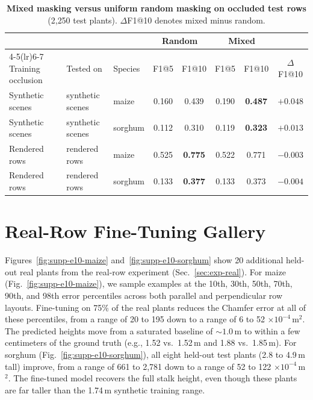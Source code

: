 \documentclass[10pt,twocolumn,letterpaper]{article}
\begin{document}
\begin{table}[t]
  \caption{\textbf{Mixed masking versus uniform random masking on occluded test rows} (2{,}250 test plants). $\Delta$F1@10 denotes mixed minus random.}
  \label{tab:mixed_scene}
  \centering\small
  \begin{tabular}{@{}lllccccc@{}}
    \toprule
    & & & \multicolumn{2}{c}{Random} & \multicolumn{2}{c}{Mixed} & \\
    \cmidrule(lr){4-5}\cmidrule(lr){6-7}
    Training occlusion & Tested on & Species & F1@5 & F1@10 & F1@5 & F1@10 & $\Delta$F1@10 \\
    \midrule
    Synthetic scenes & synthetic scenes & maize   & 0.160 & 0.439 & 0.190 & \textbf{0.487} & $+0.048$ \\
    Synthetic scenes & synthetic scenes & sorghum & 0.112 & 0.310 & 0.119 & \textbf{0.323} & $+0.013$ \\
    \midrule
    Rendered rows & rendered rows & maize   & 0.525 & \textbf{0.775} & 0.522 & 0.771 & $-0.003$ \\
    Rendered rows & rendered rows & sorghum & 0.133 & \textbf{0.377} & 0.133 & 0.373 & $-0.004$ \\
    \bottomrule
  \end{tabular}
\end{table}

\section{Real-Row Fine-Tuning Gallery}
\label{sec:supp-e10}

Figures~\ref{fig:supp-e10-maize} and~\ref{fig:supp-e10-sorghum} show 20 additional held-out real plants from the real-row experiment (Sec.~\ref{sec:exp-real}). For maize (Fig.~\ref{fig:supp-e10-maize}), we sample examples at the 10th, 30th, 50th, 70th, 90th, and 98th error percentiles across both parallel and perpendicular row layouts. Fine-tuning on 75\% of the real plants reduces the Chamfer error at all of these percentiles, from a range of 20 to 195 down to a range of 6 to 52 $\times 10^{-4}$\,m$^2$. The predicted heights move from a saturated baseline of $\sim 1.0$\,m to within a few centimeters of the ground truth (e.g., 1.52 vs.\ 1.52\,m and 1.88 vs.\ 1.85\,m). For sorghum (Fig.~\ref{fig:supp-e10-sorghum}), all eight held-out test plants (2.8 to 4.9\,m tall) improve, from a range of 661 to 2{,}781 down to a range of 52 to 122 $\times 10^{-4}$\,m$^2$. The fine-tuned model recovers the full stalk height, even though these plants are far taller than the 1.74\,m synthetic training range.
\end{document}
